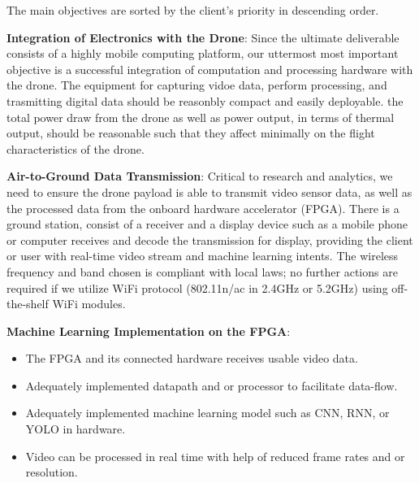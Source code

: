 The main objectives are sorted by the client's priority in descending order.

\textbf{Integration of Electronics with the Drone}:
Since the ultimate deliverable consists of a highly mobile computing platform,
our uttermost most important objective is a successful integration of computation and processing hardware with the drone.
The equipment for capturing vidoe data, perform processing, and trasmitting digital data should be reasonbly compact and easily deployable.
the total power draw from the drone as well as power output, in terms of thermal output, should be reasonable such that they affect minimally
on the flight characteristics of the drone.

\textbf{Air-to-Ground Data Transmission}:
Critical to research and analytics, we need to ensure the drone payload is able to transmit video sensor data, as well as the processed data
from the onboard hardware accelerator (FPGA). There is a ground station, consist of a receiver and a display device such as a mobile phone or 
computer receives and decode the transmission for display, providing the client or user with real-time video stream and machine learning intents.
The wireless frequency and band chosen is compliant with local laws; no further actions are required if we utilize WiFi protocol (802.11n/ac in 2.4GHz or 5.2GHz)
using off-the-shelf WiFi modules.

\textbf{Machine Learning Implementation on the FPGA}:




\begin{itemize}
  \item The FPGA and its connected hardware receives usable video data.
  \item Adequately implemented datapath and or processor to facilitate data-flow.
  \item Adequately implemented machine learning model such as CNN, RNN, or YOLO in hardware.
  \item Video can be processed in real time with help of reduced frame rates and or resolution.
\end{itemize}